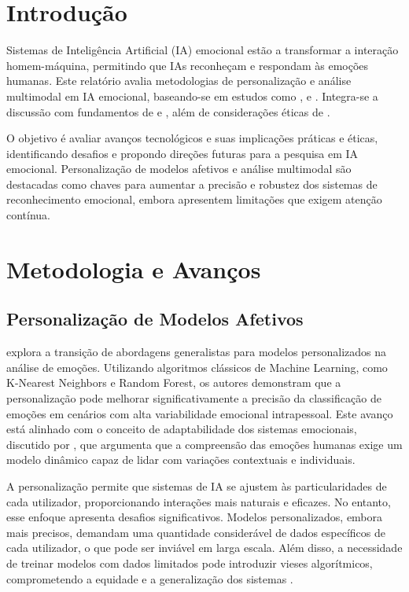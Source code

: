 \documentclass[a4paper,12pt]{report}
\begin{document}
	\section{Introdução}
	
	Sistemas de Inteligência Artificial (IA) emocional estão a transformar a interação homem-máquina, permitindo que IAs reconheçam e respondam às emoções humanas. Este relatório avalia metodologias de personalização e análise multimodal em IA emocional, baseando-se em estudos como \textcite{kargarandehkordi2024}, \textcite{gursesli2024} e \textcite{lee2024}. Integra-se a discussão com fundamentos de \textcite{picard1997} e \textcite{pessoa2013}, além de considerações éticas de \textcite{mueller2020}.
	
	O objetivo é avaliar avanços tecnológicos e suas implicações práticas e éticas, identificando desafios e propondo direções futuras para a pesquisa em IA emocional. Personalização de modelos afetivos e análise multimodal são destacadas como chaves para aumentar a precisão e robustez dos sistemas de reconhecimento emocional, embora apresentem limitações que exigem atenção contínua.
	
	
	\section{Metodologia e Avanços}
	
	\subsection{Personalização de Modelos Afetivos}
	
	\textcite{kargarandehkordi2024} explora a transição de abordagens generalistas para modelos personalizados na análise de emoções. Utilizando algoritmos clássicos de Machine Learning, como K-Nearest Neighbors e Random Forest, os autores demonstram que a personalização pode melhorar significativamente a precisão da classificação de emoções em cenários com alta variabilidade emocional intrapessoal. Este avanço está alinhado com o conceito de adaptabilidade dos sistemas emocionais, discutido por \textcite{picard1997}, que argumenta que a compreensão das emoções humanas exige um modelo dinâmico capaz de lidar com variações contextuais e individuais.
	
	A personalização permite que sistemas de IA se ajustem às particularidades de cada utilizador, proporcionando interações mais naturais e eficazes. No entanto, esse enfoque apresenta desafios significativos. Modelos personalizados, embora mais precisos, demandam uma quantidade considerável de dados específicos de cada utilizador, o que pode ser inviável em larga escala. Além disso, a necessidade de treinar modelos com dados limitados pode introduzir vieses algorítmicos, comprometendo a equidade e a generalização dos sistemas \parencite{mueller2020}.
	
\end{document}
